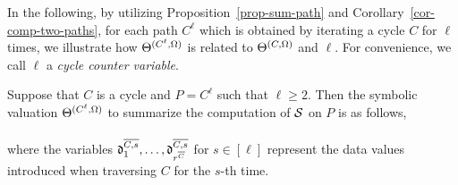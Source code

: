 In the following, by utilizing Proposition~\ref{prop-sum-path} and Corollary~\ref{cor-comp-two-paths}, for each path $C^{\ell}$ which is obtained by iterating a cycle $C$ for $\ell$ times, we illustrate how $\Theta^{(C^\ell,\Omega)}$ is related to $\Theta^{(C, \Omega)}$ and $\ell$. For convenience, we call $\ell$ a \emph{cycle counter variable}.

\begin{proposition}\label{prop-sum-cycle}
Suppose that $C$ is a cycle and $P=C^{\ell}$ such that $\ell \ge 2$. Then the symbolic valuation $\Theta^{(C^\ell,\Omega)}$ to summarize the computation of ${\mathcal{S} }$ on $P$ is as follows,\medskip\\
\medskip\\
where the variables $\mathfrak{d}^{\overline{C , s}}_{1},\dots, \mathfrak{d}^{\overline{C ,s}}_{r^{\overline{C}}}$ for $s\in [\ell]$
 represent the data values introduced when traversing $C$ for the $s$-th time.
\end{proposition}


